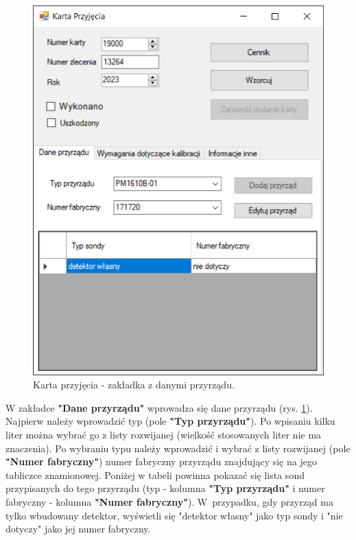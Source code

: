 \begin{figure}[htb]
	\centering
	\includegraphics{obrazki/Biuro/karta/karta_dane_przyrzadu.png}
	\caption{Karta przyjęcia - zakładka z danymi przyrządu.}
	\label{kartaDanePrzyrzadu}
\end{figure}

W zakładce \textbf{"Dane przyrządu"} wprowadza się dane przyrządu (rys. \ref{kartaDanePrzyrzadu}). Najpierw należy wprowadzić typ (pole \textbf{"Typ przyrządu"}). Po wpisaniu kilku liter można wybrać go z listy rozwijanej (wielkość stosowanych liter nie ma znaczenia). Po wybraniu typu należy wprowadzić i wybrać z listy rozwijanej (pole \textbf{"Numer fabryczny"}) numer fabryczny przyrządu znajdujący się na jego tabliczce znamionowej. Poniżej w tabeli powinna pokazać się lista sond przypisanych do tego przyrządu (typ - kolumna \textbf{"Typ przyrządu"} i numer fabryczny - kolumna \textbf{"Numer fabryczny"}). W~przypadku, gdy przyrząd ma tylko wbudowany detektor, wyświetli się "detektor własny" jako typ sondy i "nie dotyczy" jako jej numer fabryczny. 


